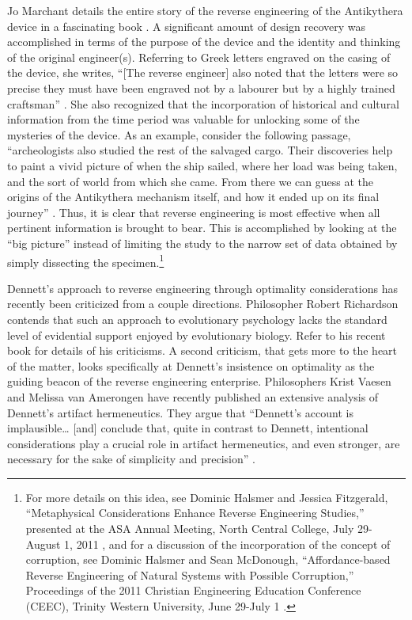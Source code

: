 Jo Marchant details the entire story of the reverse engineering of the
Antikythera device in a fascinating book \citep{marchant2009}. A
significant amount of design recovery was accomplished in terms of the
purpose of the device and the identity and thinking of the original
engineer(s). Referring to Greek letters engraved on the casing of the
device, she writes, “[The reverse engineer] also noted that the letters
were so precise they must have been engraved not by a labourer but by a
highly trained craftsman” \citep[][p.~55]{marchant2009}. She also recognized that
the incorporation of historical and cultural information from the time
period was valuable for unlocking some of the mysteries of the device.
As an example, consider the following passage, “archeologists also
studied the rest of the salvaged cargo. Their discoveries help to paint
a vivid picture of when the ship sailed, where her load was being
taken, and the sort of world from which she came. From there we can
guess at the origins of the Antikythera mechanism itself, and how it
ended up on its final journey” \citep[][p.~61]{marchant2009}. Thus, it is clear
that reverse engineering is most effective when all pertinent
information is brought to bear. This is accomplished by looking at the
“big picture” instead of limiting the study to the narrow set of data
obtained by simply dissecting the specimen.\footnote{
For more details on this idea, see Dominic Halsmer
and Jessica Fitzgerald, ``Metaphysical Considerations Enhance Reverse
Engineering Studies,'' presented at the ASA Annual Meeting, North
Central College, July 29-August 1, 2011 \citep{halsmerfitzgerald2011}, and for a discussion of the
incorporation of the concept of corruption, see Dominic Halsmer and
Sean McDonough, ``Affordance-based Reverse Engineering of Natural
Systems with Possible Corruption,'' Proceedings of the 2011 Christian
Engineering Education Conference (CEEC), Trinity Western University,
June 29-July 1 \citep{halsmermcdonough2011}.
}

Dennett’s approach to reverse engineering through optimality
considerations has recently been criticized from a couple directions.
Philosopher Robert Richardson contends that such an approach to
evolutionary psychology lacks the standard level of evidential support
enjoyed by evolutionary biology. Refer to his recent
book \citep{richardson2007} for details of his criticisms. A second
criticism, that gets more to the heart of the matter, looks
specifically at Dennett’s insistence on optimality as the guiding
beacon of the reverse engineering enterprise. Philosophers Krist Vaesen
and Melissa van Amerongen have recently published an extensive analysis
of Dennett’s artifact hermeneutics. They argue that “Dennett’s account
is implausible{\ldots} [and] conclude that, quite in contrast to Dennett,
intentional considerations play a crucial role in artifact
hermeneutics, and even stronger, are necessary for the sake of
simplicity and precision” \citep[][p.~779]{vaesenamerongen2008}.

